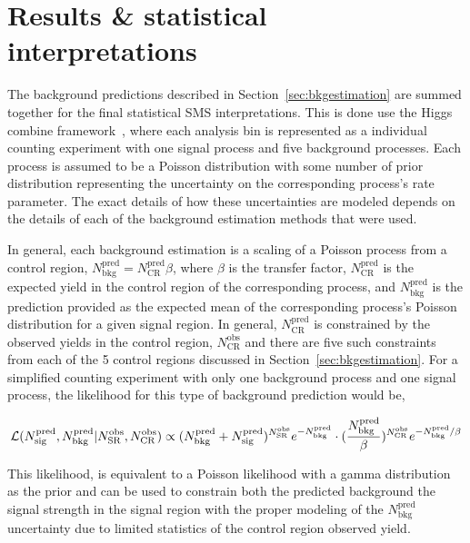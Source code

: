 \section{Results \& statistical interpretations}
\label{sec:results}

The background predictions described in Section~\ref{sec:bkgestimation} are 
summed together for the final statistical SMS interpretations.   This is
done use the Higgs combine framework~\cite{Hcombine}, where each analysis
bin is represented as a individual counting experiment with one 
signal process and five background processes.  Each process is assumed 
to be a Poisson distribution with some number of prior distribution representing
the uncertainty on the corresponding process's rate parameter. The exact
details of how these uncertainties are modeled depends on the 
details of each of the background estimation methods that were used. 

In general, each background estimation is a scaling of a Poisson process 
from a control region, $N^{\mathrm{pred}}_{\mathrm{bkg}}=N^{\mathrm{pred}}_{\mathrm{CR}}\beta$, where $\beta$ 
is the transfer factor, $N^{\mathrm{pred}}_{\mathrm{CR}}$ is the expected yield in the 
control region of the corresponding process, and $N^{\mathrm{pred}}_{\mathrm{bkg}}$ is the 
prediction provided as the expected mean of the corresponding process's
Poisson distribution for a given signal region.  In general,  $N^{\mathrm{pred}}_{\mathrm{CR}}$
is constrained by the observed yields in the control region, 
$N^{\mathrm{obs}}_{\mathrm{CR}}$ and there are five such constraints from each 
of the 5 control regions discussed in Section~\ref{sec:bkgestimation}.  For a 
simplified counting experiment with only one background process and one signal
process, the likelihood for this type of background prediction would be, 

\begin{equation}
\centering
\mathcal{L}(N^{\mathrm{pred}}_{\mathrm{sig}},N^{\mathrm{pred}}_{\mathrm{bkg}}|N^{\mathrm{obs}}_{\mathrm{SR}},N^{\mathrm{obs}}_{\mathrm{CR}}) \propto (N^{\mathrm{pred}}_{\mathrm{bkg}}+N^{\mathrm{pred}}_{\mathrm{sig}})^{N^{\mathrm{obs}}_{\mathrm{SR}}}e^{-N^{\mathrm{pred}}_{\mathrm{bkg}}}\cdot(\frac{N^{\mathrm{pred}}_{\mathrm{bkg}}}{\beta})^{N^{\mathrm{obs}}_{\mathrm{CR}}} e^{-N^{\mathrm{pred}}_{\mathrm{bkg}}/\beta}
\end{equation}

This likelihood, is equivalent to a Poisson likelihood with a gamma distribution
as the prior and can be used to constrain both the predicted background the 
signal strength in the signal region with the proper modeling of the $N^{\mathrm{pred}}_{\mathrm{bkg}}$ 
uncertainty due to limited statistics of the control region observed yield.

